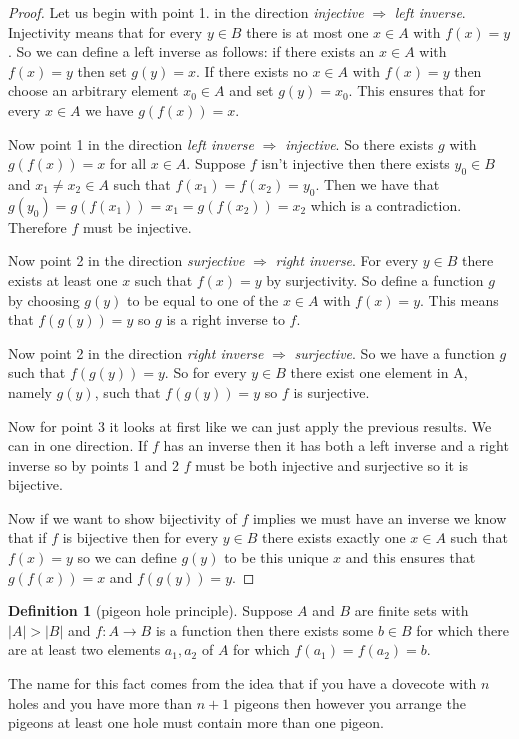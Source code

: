 \documentclass[
]{book}
\theoremstyle{definition}
\newtheorem{definition}{Definition}[chapter]
\theoremstyle{definition}
\theoremstyle{definition}
\theoremstyle{definition}
\theoremstyle{remark}
\begin{document}
\begin{proof}
Let us begin with point 1. in the direction \emph{injective} \(\Rightarrow\) \emph{left inverse}. Injectivity means that for every \(y \in B\) there is at most one \(x \in A\) with \(f(x) = y\). So we can define a left inverse as follows: if there exists an \(x \in A\) with \(f(x)=y\) then set \(g(y) =x\). If there exists no \(x \in A\) with \(f(x)=y\) then choose an arbitrary element \(x_0 \in A\) and set \(g(y) = x_0\). This ensures that for every \(x \in A\) we have \(g(f(x))= x\).

Now point 1 in the direction \emph{left inverse} \(\Rightarrow\) \emph{injective}. So there exists \(g\) with \(g(f(x))=x\) for all \(x \in A\). Suppose \(f\) isn't injective then there exists \(y_0 \in B\) and \(x_1 \neq x_2 \in A\) such that \(f(x_1) = f(x_2) = y_0\). Then we have that \(g(y_0) = g(f(x_1))= x_1 = g(f(x_2))=x_2\) which is a contradiction. Therefore \(f\) must be injective.

Now point 2 in the direction \emph{surjective} \(\Rightarrow\) \emph{right inverse}. For every \(y \in B\) there exists at least one \(x\) such that \(f(x)=y\) by surjectivity. So define a function \(g\) by choosing \(g(y)\) to be equal to one of the \(x \in A\) with \(f(x) = y\). This means that \(f(g(y))= y\) so \(g\) is a right inverse to \(f\).

Now point 2 in the direction \emph{right inverse} \(\Rightarrow\) \emph{surjective}. So we have a function \(g\) such that \(f(g(y))=y\). So for every \(y \in B\) there exist one element in A, namely \(g(y)\), such that \(f(g(y))=y\) so \(f\) is surjective.

Now for point 3 it looks at first like we can just apply the previous results. We can in one direction. If \(f\) has an inverse then it has both a left inverse and a right inverse so by points 1 and 2 \(f\) must be both injective and surjective so it is bijective.

Now if we want to show bijectivity of \(f\) implies we must have an inverse we know that if \(f\) is bijective then for every \(y\in B\) there exists exactly one \(x \in A\) such that \(f(x) = y\) so we can define \(g(y)\) to be this unique \(x\) and this ensures that \(g(f(x))= x\) and \(f(g(y))= y\).
\end{proof}

\begin{definition}[pigeon hole principle]
Suppose \(A\) and \(B\) are finite sets with \(|A| > |B|\) and \(f: A \rightarrow B\) is a function then there exists some \(b \in B\) for which there are at least two elements \(a_1,a_2\) of \(A\) for which \(f(a_1)=f(a_2)=b\).

The name for this fact comes from the idea that if you have a dovecote with \(n\) holes and you have more than \(n+1\) pigeons then however you arrange the pigeons at least one hole must contain more than one pigeon.
\end{definition}
\end{document}
